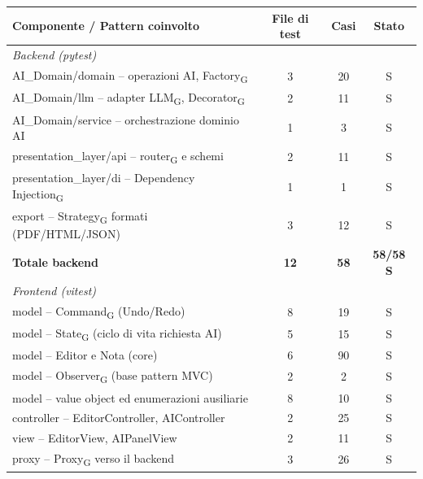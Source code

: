 \renewcommand{\arraystretch}{1.3}
\begin{table}[H]
    \centering
    \begin{tabularx}{\textwidth}{|X|c|c|c|}
        \hline
        \rowcolor{primarycolor!10}
        \textbf{Componente / Pattern coinvolto} & \textbf{File di test} & \textbf{Casi} & \textbf{Stato} \\
        \hline
        \multicolumn{4}{|l|}{\cellcolor{primarycolor!5}\textit{Backend (pytest)}} \\
        \hline
        AI\_Domain/domain -- operazioni AI, Factory\textsubscript{G} & 3 & 20 & S \\
        \hline
        AI\_Domain/llm -- adapter LLM\textsubscript{G}, Decorator\textsubscript{G} & 2 & 11 & S \\
        \hline
        AI\_Domain/service -- orchestrazione dominio AI & 1 & 3 & S \\
        \hline
        presentation\_layer/api -- router\textsubscript{G} e schemi & 2 & 11 & S \\
        \hline
        presentation\_layer/di -- Dependency Injection\textsubscript{G} & 1 & 1 & S \\
        \hline
        export -- Strategy\textsubscript{G} formati (PDF/HTML/JSON) & 3 & 12 & S \\
        \hline
        \textbf{Totale backend} & \textbf{12} & \textbf{58} & \textbf{58/58 S} \\
        \hline
        \multicolumn{4}{|l|}{\cellcolor{primarycolor!5}\textit{Frontend (vitest)}} \\
        \hline
        model -- Command\textsubscript{G} (Undo/Redo) & 8 & 19 & S \\
        \hline
        model -- State\textsubscript{G} (ciclo di vita richiesta AI) & 5 & 15 & S \\
        \hline
        model -- Editor e Nota (core) & 6 & 90 & S \\
        \hline
        model -- Observer\textsubscript{G} (base pattern MVC) & 2 & 2 & S \\
        \hline
        model -- value object ed enumerazioni ausiliarie & 8 & 10 & S \\
        \hline
        controller -- EditorController, AIController & 2 & 25 & S \\
        \hline
        view -- EditorView, AIPanelView & 2 & 11 & S \\
        \hline
        proxy -- Proxy\textsubscript{G} verso il backend & 3 & 26 & S \\

\end{tabularx}
\end{table}
